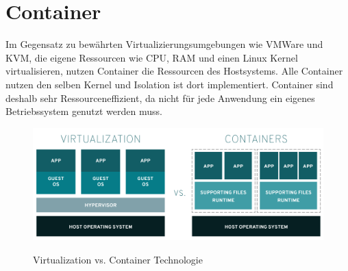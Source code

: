 \section{Container}
\label{sec:grundlagen:container}

Im Gegensatz zu bewährten Virtualizierungsumgebungen wie VMWare und KVM, 
die eigene Ressourcen wie CPU, RAM und einen Linux Kernel virtualisieren,
nutzen Container die Ressourcen des Hostsystems. 
Alle Container nutzen den selben Kernel und Isolation ist dort implementiert.
Container sind deshalb sehr Ressourceneffizient, da nicht für jede Anwendung ein eigenes
Betriebssystem genutzt werden muss. \cite{Kane2018}

\begin{figure}
  \includegraphics[width=\textwidth]{gfx/chapters/2_grundlagen/virtualization-vs-containers.png}
  \label{fig:container:vergleich}
  \caption{Virtualization vs. Container Technologie}
\end{figure}